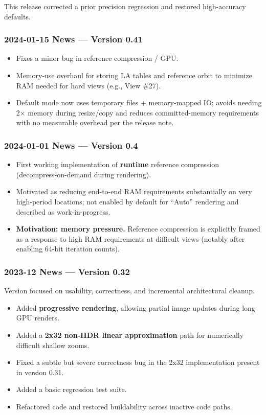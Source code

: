 This release corrected a prior precision regression and restored high-accuracy defaults.


\subsubsection{2024-01-15 News --- Version 0.41}

\begin{itemize}
  \item Fixes a minor bug in reference compression / GPU.
  \item Memory-use overhaul for storing LA tables and reference orbit to minimize RAM needed for hard views (e.g., View \#27).
  \item Default mode now uses temporary files + memory-mapped IO; avoids needing 2$\times$ memory during resize/copy and reduces committed-memory requirements with no measurable overhead per the release note.
\end{itemize}


\subsubsection{2024-01-01 News --- Version 0.4}

\begin{itemize}
  \item First working implementation of \textbf{runtime} reference compression
  (decompress-on-demand during rendering).

  \item Motivated as reducing end-to-end RAM requirements substantially on very
  high-period locations; not enabled by default for “Auto” rendering and
  described as work-in-progress.

  \item \textbf{Motivation: memory pressure.} Reference compression is
  explicitly framed as a response to high RAM requirements at difficult views
  (notably after enabling 64-bit iteration counts).
\end{itemize}


\subsubsection{2023-12 News --- Version 0.32}

Version  focused on usability, correctness, and incremental architectural cleanup.

\begin{itemize}
  \item Added \textbf{progressive rendering}, allowing partial image updates
  during long GPU renders.
  \item Added a \textbf{2x32 non-HDR linear approximation} path for numerically
  difficult shallow zooms.
  \item Fixed a subtle but severe correctness bug in the 2x32 implementation
  present in version 0.31.
  \item Added a basic regression test suite.
  \item Refactored code and restored buildability across inactive code paths.
\end{itemize}


